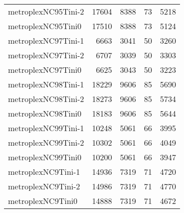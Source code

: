 \documentclass[../../../thesis.tex]{subfiles}
\begin{document}
\begin{longtable}{lrrrr}
metroplexNC95Tini-2 & 17604 & 8388 & 73 & 5218 \\
metroplexNC95Tini0 & 17510 & 8388 & 73 & 5124 \\
metroplexNC97Tini-1 & 6663 & 3041 & 50 & 3260 \\
metroplexNC97Tini-2 & 6707 & 3039 & 50 & 3303 \\
metroplexNC97Tini0 & 6625 & 3043 & 50 & 3223 \\
metroplexNC98Tini-1 & 18229 & 9606 & 85 & 5690 \\
metroplexNC98Tini-2 & 18273 & 9606 & 85 & 5734 \\
metroplexNC98Tini0 & 18183 & 9606 & 85 & 5644 \\
metroplexNC99Tini-1 & 10248 & 5061 & 66 & 3995 \\
metroplexNC99Tini-2 & 10302 & 5061 & 66 & 4049 \\
metroplexNC99Tini0 & 10200 & 5061 & 66 & 3947 \\
metroplexNC9Tini-1 & 14936 & 7319 & 71 & 4720 \\
metroplexNC9Tini-2 & 14986 & 7319 & 71 & 4770 \\
metroplexNC9Tini0 & 14888 & 7319 & 71 & 4672 \\
\end{longtable}
\end{document}
